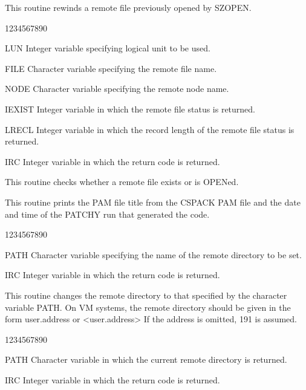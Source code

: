 \par
This routine rewinds a remote file
previously opened by SZOPEN.
\begin{DLtt}{1234567890}
\item[LUN]Integer variable specifying logical unit to be used.
\item[FILE]Character variable specifying the remote file name.
\item[NODE]Character variable specifying the remote node name.
\item[IEXIST]Integer variable in which the remote file status is returned.
\item[LRECL]Integer variable in which the record length of the
remote file status is returned.
\item[IRC]Integer variable in which the return code is returned.
\end{DLtt}
\par
This routine checks whether a remote file exists or is OPENed.
\par
This routine prints the PAM file title from the CSPACK
PAM file and the date and time of the PATCHY run
that generated the code.
\begin{DLtt}{1234567890}
\item[PATH]Character variable specifying the name of the remote directory
to be set.
\item[IRC]Integer variable in which the return code is returned.
\end{DLtt}
\par
This routine changes the remote directory to that specified by
the character variable PATH. On VM systems, the remote directory
should be given in the form user.address or <user.address>
If the address is omitted, 191 is assumed.
\begin{DLtt}{1234567890}
\item[PATH]Character variable in which the current remote directory
is returned.
\item[IRC]Integer variable in which the return code is returned.
\end{DLtt}
